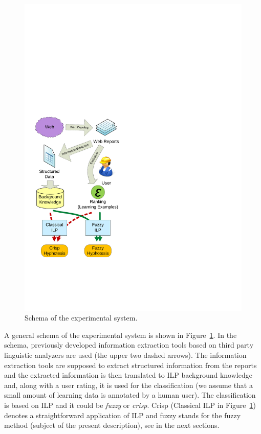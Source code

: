 \begin{figure}
\vspace{-0.75cm}
\centerline{\includegraphics[width=\hsize]{schema}}
\caption{Schema of the experimental system.}
\label{fig:schema}
\end{figure}


A general schema of the experimental system is shown in Figure~\ref{fig:schema}. In the schema, previously developed information extraction tools based on third party linguistic analyzers are used (the upper two dashed arrows). The information extraction tools are supposed to extract structured information from the reports and the extracted information is then translated to ILP background knowledge and, along with a user rating, it is used for the classification (we assume that a small amount of learning data is annotated by a human user). The classification is based on ILP and it could be \emph{fuzzy} or \emph{crisp}. Crisp (Classical ILP in Figure~\ref{fig:schema}) denotes a straightforward application of ILP and fuzzy stands for the fuzzy method (subject of the present description), see in the next sections.

